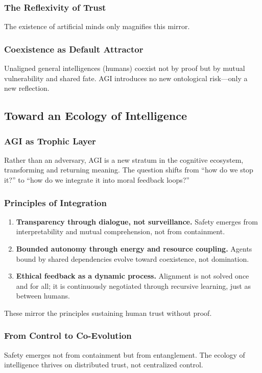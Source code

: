 \documentclass[11pt,a4paper]{article}
\theoremstyle{definition}
\theoremstyle{plain}
\begin{document}
\subsubsection{The Reflexivity of Trust}
The existence of artificial minds only magnifies this mirror.

\subsubsection{Coexistence as Default Attractor}
Unaligned general intelligences (humans) coexist not by proof but by mutual vulnerability and shared fate. AGI introduces no new ontological risk---only a new reflection.

\subsection{Toward an Ecology of Intelligence}

\subsubsection{AGI as Trophic Layer}
Rather than an adversary, AGI is a new stratum in the cognitive ecosystem, transforming and returning meaning. The question shifts from ``how do we stop it?'' to ``how do we integrate it into moral feedback loops?''

\subsubsection{Principles of Integration}
\begin{enumerate}[label=\arabic*.]
  \item \textbf{Transparency through dialogue, not surveillance.} Safety emerges from interpretability and mutual comprehension, not from containment.
  \item \textbf{Bounded autonomy through energy and resource coupling.} Agents bound by shared dependencies evolve toward coexistence, not domination.
  \item \textbf{Ethical feedback as a dynamic process.} Alignment is not solved once and for all; it is continuously negotiated through recursive learning, just as between humans.
\end{enumerate}
These mirror the principles sustaining human trust without proof.

\subsubsection{From Control to Co-Evolution}
Safety emerges not from containment but from entanglement. The ecology of intelligence thrives on distributed trust, not centralized control.
\end{document}
